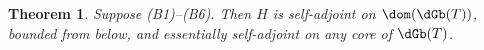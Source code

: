\documentclass[12pt,draft]{article}
\theoremstyle{plain}
\newtheorem{thm}[theorem]{\bf Theorem}
\numberwithin{equation}{section}
\theoremstyle{remark}
\begin{document}
\begin{thm}{\label{saH}}
  Suppose (B1)--(B6).
 Then $H$ is self-adjoint on $\dom(\dGb(T))$, bounded from below, 
and essentially self-adjoint on any core of $\dGb(T)$.
\end{thm}

\begin{comment}
\begin{proof}
First we write $H$ as
\begin{align*}
  H = \dGb(T) + V_N + V_N'
\end{align*}
with 
\[
V_N := \frac{1}{2} \sum_{n=1}^N \lambda_n \PhiS(g_n)^2, \qquad V_N' = \frac{1}{2}\sum_{n=N+1}^\infty \lambda_n \PhiS(g_n)^2.
\]
Let $0<\vep<1$ be as in (B5).
By (B3) and (B4), for any $0<\eta<\vep/2$, one can take a sufficiently large $N\in\NN$ and some constant $C_1(\eta)>0$ such that 
\begin{align}
  \norm{V_N'\Psi} \leq \eta \norm{\dGb(T)\Psi} + C_1(\eta)\norm{\Psi},
 \qquad \Psi\in\dom(\dGb(T)).   \label{BD0}
\end{align}
By (B6), we have $\Im\inner{g_n}{g_m}=0$, and thus $\{\PhiS(g_n)\}_n$ are strongly commuting
self-adjoint operators.
Let us define $\cM:=\mathrm{L.h.}\{T^{-1/2}g_1,\cdots,T^{-1/2}g_N\}$ and $M:=\dim \cM$.
Let $P_\cM$ be the orthogonal projection on $\cM$.
Then, by (B3) and (B5), 
\begin{align*}
  G_N := \sum_{n=1}^N \lambda_n \ket{T^{-1/2}g_n}\bra{T^{-1/2}g_n} \geq \left(\frac{\vep}{2}-1\right)P_\cM
\end{align*}
for all sufficiently large $N$. We decompose $G_N$ as $G_N=G_N^+-G_N^-$ with $G_N^\pm\geq 0$.
Then, we have $-G_N^- \geq (\vep/2-1)P_\cM$, and so
\begin{align}
 0 \leq  G_N^- \leq 1-\frac{\vep}{2}.   \label{bdGN-}
\end{align}
Let $\{e_j\}_{j=1}^M$ be the result of applying Gram-Schmidt to $\{T^{-1/2}g_1,\cdots, T^{-1/2}g_N\}$.
Note that $e_j$ are real combinations of $T^{-1/2}g_1,\cdots,T^{-1/2}g_N$, and hence $e_j\in\dom(T)$.
Also, by (B6), $Je_j=e_j$ and $\langle e_j,T^{-1/2}g_n\rangle\in\RR$.
We set $\Phi_j := \PhiS(T^{1/2}e_j)$ for each $j=1,\cdots,M$.
Thus we have
\begin{align}
 \sum_{n=1}^N \lambda_n \PhiS(g_n)^2
& = \sum_{n=1}^N \lambda_n \sum_{j,\ell=1}^M \inner{e_j}{T^{-1/2}g_n} \inner{e_\ell}{T^{-1/2}g_n} \Phi_j \Phi_\ell \notag \\
& = \sum_{j,\ell=1}^M  (G_N)_{j\ell} \Phi_j\Phi_\ell  \notag \\

\end{comment}
\end{document}
